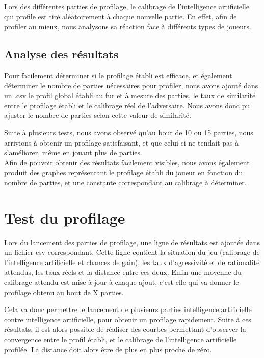 \documentclass{report}
\begin{document}
Lors des différentes parties de profilage, le calibrage de l'intelligence artificielle qui profile est tiré aléatoirement à chaque nouvelle partie. En effet, afin de profiler au mieux, nous analysons sa réaction face à différents types de joueurs.\par

\subsection{Analyse des résultats}

\hspace{0.5cm}Pour facilement déterminer si le profilage établi est efficace, et également déterminer le nombre de parties nécessaires pour profiler, nous avons ajouté dans un .csv le profil global établi au fur et à mesure des parties, le taux de similarité entre le profilage établi et le calibrage réel de l'adversaire. Nous avons donc pu ajuster le nombre de parties selon cette valeur de similarité.\par

Suite à plusieurs tests, nous avons observé qu'au bout de 10 ou 15 parties, nous arrivions à obtenir un profilage satisfaisant, et que celui-ci ne tendait pas à s'améliorer, même en jouant plus de parties.\\
	
Afin de pouvoir obtenir des résultats facilement visibles, nous avons également produit des graphes représentant le profilage établi du joueur en fonction du nombre de parties, et une constante correspondant au calibrage à déterminer.\\


\section{Test du profilage}

\hspace{0.5cm}Lors du lancement des parties de profilage, une ligne de résultats est ajoutée dans un fichier csv correspondant. Cette ligne contient la situation du jeu (calibrage de l'intelligence artificielle et chances de gain), les taux d'agressivité et de rationalité attendus, les taux réels et la distance entre ces deux. Enfin une moyenne du calibrage attendu est mise à jour à chaque ajout, c'est elle qui va donner le profilage obtenu au bout de X parties.\par
Cela va donc permettre le lancement de plusieurs parties intelligence artificielle contre intelligence artificielle, pour obtenir un profilage rapidement. Suite à ces résultats, il est alors possible de réaliser des courbes permettant d'observer la convergence entre le profil établi, et le calibrage de l'intelligence artificielle profilée. La distance doit alors être de plus en plus proche de zéro.
\end{document}
